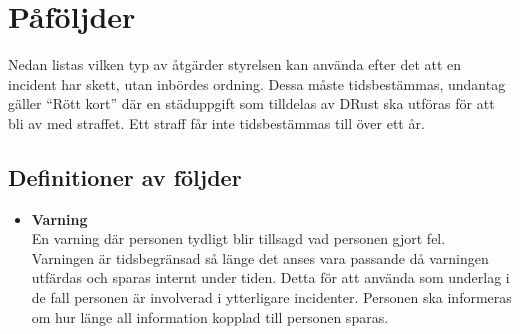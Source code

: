 \section{Påföljder}
Nedan listas vilken typ av åtgärder styrelsen kan använda efter det att en incident har skett, utan inbördes ordning. Dessa måste tidsbestämmas, undantag gäller ``Rött kort'' där en städuppgift som tilldelas av DRust ska utföras för att bli av med straffet. Ett straff får inte tidsbestämmas till över ett år.

\subsection{Definitioner av följder}
\begin{itemize}
    \item \textbf{Varning}\\
    En varning där personen tydligt blir tillsagd vad personen gjort fel. Varningen är tidsbegränsad så länge det anses vara passande då varningen utfärdas och sparas internt under tiden. Detta för att använda som underlag i de fall personen är involverad i ytterligare incidenter. Personen ska informeras om hur länge all information kopplad till personen sparas. 


\end{itemize}
